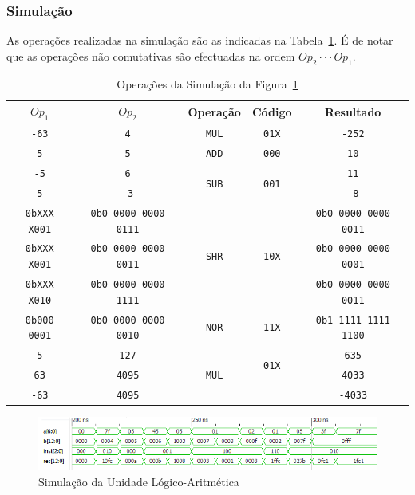 \documentclass[a4paper]{article}
\begin{document}
\subsubsection{Simulação}
As operações realizadas na simulação são as indicadas na Tabela~\ref{tab:ALUsim}. É de notar que as operações não comutativas são efectuadas na ordem $ Op_2 \cdot \cdot \cdot Op_1 $.
\begin{table}[h]
	\begin{tabular}{|c | c || c | c | c|}
		\hline
		$Op_1$ & $Op_2$ & Operação & Código & Resultado \\
		\hline
		\texttt{-63} & \texttt{4} & \texttt{MUL} & \texttt{01X} & \texttt{-252} \\
		\hline
		\texttt{5} & \texttt{5} & \texttt{ADD} & \texttt{000} & \texttt{10} \\
		\hline
		\texttt{-5} & \texttt{6} & \multirow{2}{*}{\texttt{SUB}} & \multirow{2}{*}{\texttt{001}} & \texttt{11} \\
		\texttt{5} & \texttt{-3} & & & \texttt{-8} \\
		\hline
		\texttt{0bXXX X001} & \texttt{0b0 0000 0000 0111} & \multirow{3}{*}{\texttt{SHR}} & \multirow{3}{*}{\texttt{10X}} & \texttt{0b0 0000 0000 0011} \\
		\texttt{0bXXX X001} & \texttt{0b0 0000 0000 0011} & & & \texttt{0b0 0000 0000 0001} \\
		\texttt{0bXXX X010} & \texttt{0b0 0000 0000 1111} & & & \texttt{0b0 0000 0000 0011} \\
		\hline
		\texttt{0b000 0001} & \texttt{0b0 0000 0000 0010} & \texttt{NOR} & \texttt{11X} & \texttt{0b1 1111 1111 1100} \\
		\hline
		\texttt{5} & \texttt{127} & \multirow{3}{*}{\texttt{MUL}} & \multirow{2}{*}{\texttt{01X}} & \texttt{635} \\
		\texttt{63} & \texttt{4095} & & & \texttt{4033} \\
		\texttt{-63} & \texttt{4095} & & & \texttt{-4033} \\
		\hline
	\end{tabular}
	\caption{Operações da Simulação da Figura~\ref{fig:ALUsim}}
        \label{tab:ALUsim}
\end{table}

\begin{figure}[h]
	\centering
	\includegraphics[width=\textwidth]{ALU_sim}
	\caption{Simulação da Unidade Lógico-Aritmética}
	\label{fig:ALUsim}
\end{figure}
\pagebreak
\end{document}
